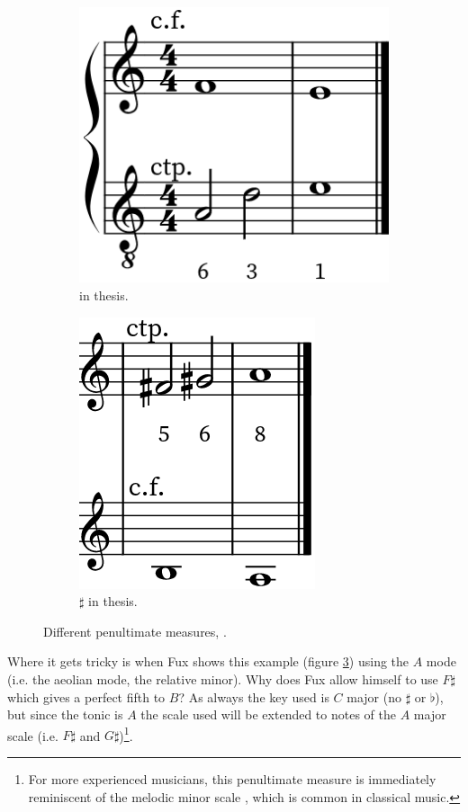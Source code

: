 \begin{enumerate}[wide, label=\bfseries 2.H\arabic*]
    \begin{figure}[h]
        \centering
        \begin{subfigure}{.5\textwidth}
            \centering
            \includegraphics[height=\fh]{Images/penult_2nd_sixth.png}
            \caption{ in thesis.}
            \label{fig:penultexsixth}
        \end{subfigure}%
        \begin{subfigure}{.5\textwidth}
            \centering
            \includegraphics[height=\fh]{Images/penult_2nd_sharped.png}
            \caption{$\sharp$ in thesis.}
            \label{fig:penultexfifth}
        \end{subfigure}
        \caption{Different penultimate measures, .}
    \end{figure}

    Where it gets tricky is when Fux shows this example (figure \ref{fig:penultexfifth}) using the $A$ mode (i.e. the aeolian mode, the relative minor). Why does Fux allow himself to use $F\sharp$ which gives a perfect fifth to $B$? As always the key used is $C$ major (no $\sharp$ or $\flat$), but since the tonic is $A$ the scale used will be extended to notes of the $A$ major scale (i.e. $F\sharp$ and $G\sharp$)\footnote{For more experienced musicians, this penultimate measure is immediately reminiscent of the melodic minor scale \parencite{Minori}, which is common in classical music.}.


\end{enumerate}
